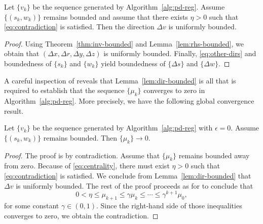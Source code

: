 \documentclass{amsart}
\begin{document}
\begin{blemma}
  \label{lem:dir-bounded}
  Let $\{v_k\}$ be the sequence generated by Algorithm~\ref{alg:pd-reg}. Assume
  $\{(s_k, w_k)\}$ remains bounded and assume that there exists $\eta > 0$
  such that \eqref{eq:contradiction} is satisfied. Then the direction $\Delta
  v$ is uniformly bounded.
\end{blemma}

\begin{proof}
  Using Theorem~\ref{thm:inv-bounded} and Lemma~\ref{lem:rhs-bounded}, we obtain
  that $(\Delta x, \Delta r, \Delta y, \Delta z)$ is uniformly bounded.
  Finally, \eqref{eq:other-dirs}
  and boundedness of $\{s_k\}$ and $\{w_k\}$ yield boundedness of $\{\Delta
  s\}$ and $\{\Delta w\}$.
\end{proof}

A careful inspection of \cite[\S$5.2$ and \S$5.4$]{friedlander-orban-2012}
reveals that Lemma~\ref{lem:dir-bounded} is all that is required to establish
that the sequence $\{\mu_k\}$ converges to zero in Algorithm~\ref{alg:pd-reg}.
More precisely, we have the following global convergence result.

\begin{btheorem}
  \label{thm:global-conv}
  Let $\{v_k\}$ be the sequence generated by Algorithm~\ref{alg:pd-reg} with
  $\epsilon = 0$. Assume $\{(s_k, w_k)\}$ remains bounded. Then $\{\mu_k\} \to
  0$.
\end{btheorem}

\begin{proof}
  The proof is by contradiction. Assume that $\{\mu_k\}$ remains bounded away
  from zero. Because of \eqref{eq:centrality}, there must exist $\eta > 0$
  such that \eqref{eq:contradiction} is satisfied. We conclude from
  Lemma~\ref{lem:dir-bounded} that $\Delta v$ is uniformly bounded. The rest of
  the proof proceeds as for \cite[Theorem~$5.4$]{friedlander-orban-2012} to
  conclude that
  \[
    0 < \eta \leq \mu_{k+1} \leq \gamma \mu_k \leq \cdots \leq \gamma^{k+1}
    \mu_0,
  \]
  for some constant $\gamma \in (0,1)$. Since the right-hand side of those
   inequalities converges to zero, we obtain the contradiction.
\end{proof}
\end{document}
